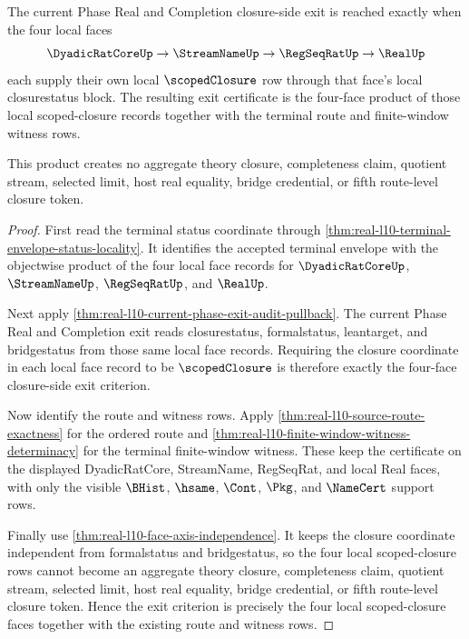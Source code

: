 \begin{theorem}
\label{thm:real-l10-scoped-four-face-exit}
The current Phase Real and Completion closure-side exit is reached exactly when
the four local faces
$$
\DyadicRatCoreUp \to \StreamNameUp \to \RegSeqRatUp \to \RealUp
$$
each supply their own local $\scopedClosure$ row through that face's local
closurestatus block. The resulting exit certificate is the four-face product of
those local scoped-closure records together with the terminal route and
finite-window witness rows.

This product creates no aggregate theory closure, completeness claim, quotient
stream, selected limit, host real equality, bridge credential, or fifth
route-level closure token.
\end{theorem}
\begin{proof}
First read the terminal status coordinate through
\autoref{thm:real-l10-terminal-envelope-status-locality}. It identifies the
accepted terminal envelope with the objectwise product of the four local face
records for $\DyadicRatCoreUp$, $\StreamNameUp$, $\RegSeqRatUp$, and
$\RealUp$.

Next apply \autoref{thm:real-l10-current-phase-exit-audit-pullback}. The
current Phase Real and Completion exit reads closurestatus, formalstatus,
leantarget, and bridgestatus from those same local face records. Requiring the
closure coordinate in each local face record to be $\scopedClosure$ is therefore
exactly the four-face closure-side exit criterion.

Now identify the route and witness rows. Apply
\autoref{thm:real-l10-source-route-exactness} for the ordered route and
\autoref{thm:real-l10-finite-window-witness-determinacy} for the terminal
finite-window witness. These keep the certificate on the displayed
DyadicRatCore, StreamName, RegSeqRat, and local Real faces, with only the
visible $\BHist$, $\hsame$, $\Cont$, $\Pkg$, and $\NameCert$ support rows.

Finally use \autoref{thm:real-l10-face-axis-independence}. It keeps the closure
coordinate independent from formalstatus and bridgestatus, so the four local
scoped-closure rows cannot become an aggregate theory closure, completeness
claim, quotient stream, selected limit, host real equality, bridge credential,
or fifth route-level closure token. Hence the exit criterion is precisely the
four local scoped-closure faces together with the existing route and witness
rows.
\end{proof}

